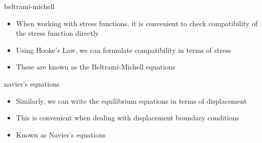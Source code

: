 \documentclass[
  letterpaper,
  ignorenonframetext,
  aspectratio=43,
  handout,
  12pt]{beamer}
\providecommand{\tightlist}{%
  \setlength{\itemsep}{0pt}\setlength{\parskip}{0pt}}
\providecommand{\tightlist}{%
\setlength{\itemsep}{0pt}\setlength{\parskip}{0pt}}
\begin{document}
\begin{frame}{beltrami-michell}
\protect\hypertarget{beltrami-michell}{}
\begin{itemize}
\tightlist
\item
  When working with stress functions, it is convenient to check
  compatibility of the stress function directly
\item
  Using Hooke's Law, we can formulate compatibility in terms of stress
\item
  These are known as the Beltrami-Michell equations
\end{itemize}
\end{frame}

\begin{frame}{navier's equations}
\protect\hypertarget{naviers-equations}{}
\begin{itemize}
\tightlist
\item
  Similarly, we can write the equilibrium equations in terms of
  displacement
\item
  This is convenient when dealing with displacement boundary conditions
\item
  Known as Navier's equations
\end{itemize}
\end{frame}
\end{document}

